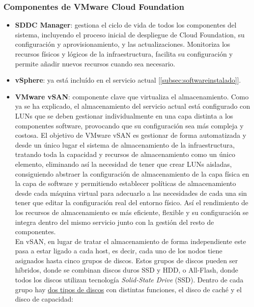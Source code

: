 \subsubsection{Componentes de VMware Cloud Foundation \cite{componentesCloudFound}}
\label{subsubsect:cfcomponents}
\begin{itemize}
    \item \textbf{SDDC Manager}: gestiona el ciclo de vida de todos los componentes del sistema, incluyendo el proceso inicial de despliegue de Cloud Foundation, su configuración y aprovisionamiento, y las actualizaciones. Monitoriza los recursos físicos y lógicos de la infraestructura, facilita su configuración y permite añadir nuevos recursos cuando sea necesario. 
    \item \textbf{vSphere}: ya está incluído en el servicio actual [\ref{subsec:softwareinstalado}].
    \item \textbf{VMware vSAN}: componente clave que virtualiza el almacenamiento. Como ya se ha explicado, el almacenamiento del servicio actual está configurado con LUNs que se deben gestionar individualmente en una capa distinta a los componentes software, provocando que su configuración sea más compleja y costosa. El objetivo de VMware vSAN es gestionar de forma automatizada y desde un único lugar el sistema de almacenamiento de la infraestructura, tratando toda la capacidad y recursos de almacenamiento como un único elemento, eliminando así la necesidad de tener que crear LUNs aisladas, consiguiendo abstraer la configuración de almacenamiento de la capa física en la capa de software y permitiendo establecer políticas de almacenamiento desde cada máquina virtual para adecuarlo a las necesidades de cada una sin tener que editar la configuración real del entorno físico. Así el rendimiento de los recursos de almacenamiento es más eficiente, flexible y su configuración se integra dentro del mismo servicio junto con la gestión del resto de componentes. \\
    En vSAN, en lugar de tratar el almacenamiento de forma independiente este pasa a estar ligado a cada host, es decir, cada uno de los nodos tiene asignados hasta cinco grupos de discos. Estos grupos de discos pueden ser híbridos, donde se combinan discos duros SSD y HDD, o All-Flash, donde todos los discos utilizan tecnología \textit{Solid-State Drive} (SSD). Dentro de cada grupo hay \underline{dos tipos de discos} con distintas funciones, el disco de caché y el disco de capacidad\cite{operacionesVSAN}:

\end{itemize}
